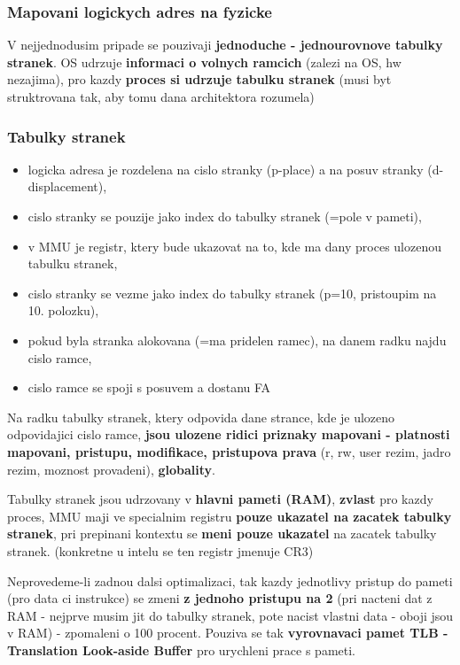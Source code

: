\documentclass[a4paper, 11pt]{article}
\begin{document}
\subsubsection{Mapovani logickych adres na fyzicke}
V nejjednodusim pripade se pouzivaji \textbf{jednoduche - jednourovnove tabulky stranek}. OS udrzuje \textbf{informaci o volnych ramcich} (zalezi na OS, hw nezajima), pro kazdy \textbf{proces si udrzuje tabulku stranek} (musi byt struktrovana tak, aby tomu dana architektora rozumela) \\

\subsubsection{Tabulky stranek}
\begin{itemize}
    \item logicka adresa je rozdelena na cislo stranky (p-place) a na posuv stranky (d-displacement),
    \item cislo stranky se pouzije jako index do tabulky stranek (=pole v pameti),
    \item v MMU je registr, ktery bude ukazovat na to, kde ma dany proces ulozenou tabulku stranek,
    \item cislo stranky se vezme jako index do tabulky stranek (p=10, pristoupim na 10. polozku),
    \item pokud byla stranka alokovana (=ma pridelen ramec), na danem radku najdu cislo ramce,
    \item cislo ramce se spoji s posuvem a dostanu FA \\
\end{itemize}

Na radku tabulky stranek, ktery odpovida dane strance, kde je ulozeno odpovidajici cislo ramce, \textbf{jsou ulozene ridici priznaky mapovani - platnosti mapovani, pristupu, modifikace, pristupova prava} (r, rw, user rezim, jadro rezim, moznost provadeni), \textbf{globality}.

Tabulky stranek jsou udrzovany v \textbf{hlavni pameti (RAM)}, \textbf{zvlast} pro kazdy proces, MMU maji ve specialnim registru \textbf{pouze ukazatel na zacatek tabulky stranek}, pri prepinani kontextu se \textbf{meni pouze ukazatel} na zacatek tabulky stranek. (konkretne u intelu se ten registr jmenuje CR3)

Neprovedeme-li zadnou dalsi optimalizaci, tak kazdy jednotlivy pristup do pameti (pro data ci instrukce) se zmeni \textbf{z jednoho pristupu na 2} (pri nacteni dat z RAM - nejprve musim jit do tabulky stranek, pote nacist vlastni data - oboji jsou v RAM) - zpomaleni o 100 procent. Pouziva se tak \textbf{vyrovnavaci pamet TLB - Translation Look-aside Buffer} pro urychleni prace s pameti.
\end{document}
